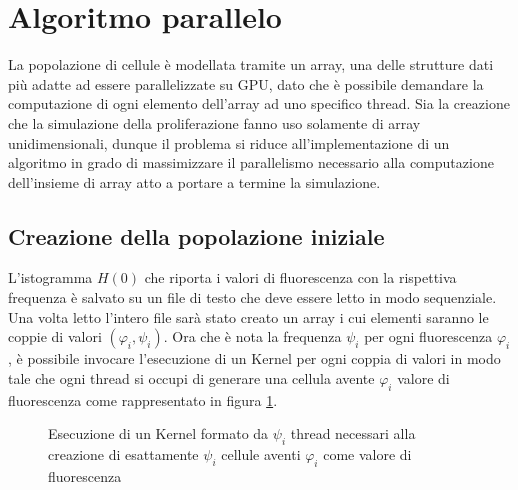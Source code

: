 \section{Algoritmo parallelo}

La popolazione di cellule è modellata tramite un array, una delle strutture
dati più adatte ad essere parallelizzate su GPU, dato che è possibile
demandare la computazione di ogni elemento dell'array ad uno specifico thread.
Sia la creazione che la simulazione della proliferazione fanno uso solamente di
array unidimensionali, dunque il problema si riduce all'implementazione di un
algoritmo in grado di massimizzare il parallelismo necessario alla computazione
dell'insieme di array atto a portare a termine la simulazione. 

\subsection{Creazione della popolazione iniziale}

L'istogramma $H(0)$ che riporta i valori di fluorescenza con la rispettiva
frequenza è salvato su un file di testo che deve essere letto in modo
sequenziale. Una volta letto l'intero file sarà stato creato un array i cui
elementi saranno le coppie di valori $(\varphi_{i}, \psi_{i})$.
Ora che è nota la frequenza $\psi_{i}$ per ogni fluorescenza $\varphi_{i}$,
è possibile invocare l'esecuzione di un Kernel per ogni coppia di
valori 
in modo tale che ogni thread si occupi di generare una cellula avente
$\varphi_{i}$ valore di fluorescenza come rappresentato in figura
\ref{fig:population-creation}.
\\
\begin{figure}[t]
    \centering
    \caption{Esecuzione di un Kernel formato da $\psi_{i}$ thread necessari alla
        creazione di esattamente $\psi_{i}$ cellule aventi $\varphi_{i}$ come
        valore di fluorescenza}
    \label{fig:population-creation}
\end{figure}

